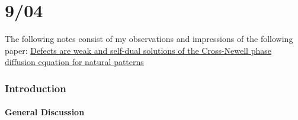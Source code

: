 \documentclass[12pt]{article}
\newcounter{solution}
\begin{document}
\part{9/04}
The following notes consist of my observations and impressions of the following paper:\newline
\href{https://reader.elsevier.com/reader/sd/pii/0167278996000735?token=1E05B69B5C19BB211B4882EB251E155B3A04AA66D17F830BB16530DC7A311404B4C9D2EE26695BF54D943B0271323C0E&originRegion=us-east-1&originCreation=20220904031131}{Defects are weak and self-dual solutions of the Cross-Newell phase diffusion equation for natural patterns}
\section{Introduction}
\subsection{General Discussion}
\end{document}
